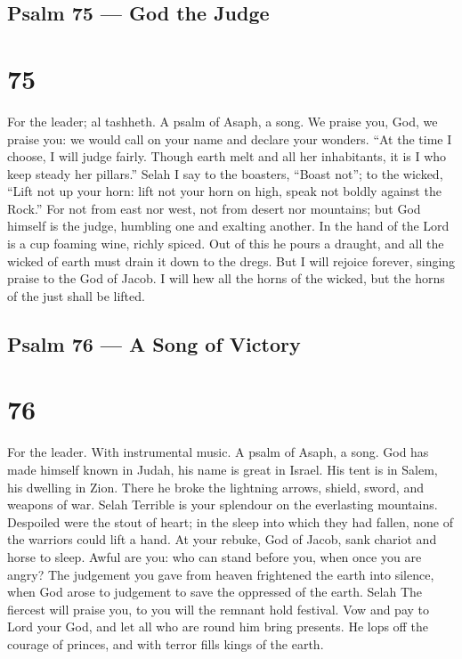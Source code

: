 \hypertarget{psalm-75-god-the-judge}{%
\subsection{Psalm 75 --- God the Judge}\label{psalm-75-god-the-judge}}

\hypertarget{section-74}{%
\section{75}\label{section-74}}

For the leader; al tashheth. A psalm of Asaph, a song.  We
praise you, God, we praise you: we would call on your name and declare
your wonders.  ``At the time I choose, I will judge fairly.
 Though earth melt and all her inhabitants, it is I who keep
steady her pillars.'' Selah  I say to the boasters, ``Boast
not''; to the wicked, ``Lift not up your horn:  lift not
your horn on high, speak not boldly against the Rock.''  For
not from east nor west, not from desert nor mountains;  but
God himself is the judge, humbling one and exalting another.
 In the hand of the Lord is a cup foaming wine, richly
spiced. Out of this he pours a draught, and all the wicked of earth must
drain it down to the dregs.  But I will rejoice forever,
singing praise to the God of Jacob.  I will hew all the
horns of the wicked, but the horns of the just shall be lifted.

\hypertarget{psalm-76-a-song-of-victory}{%
\subsection{Psalm 76 --- A Song of
Victory}\label{psalm-76-a-song-of-victory}}

\hypertarget{section-75}{%
\section{76}\label{section-75}}

For the leader. With instrumental music. A psalm of Asaph, a song.
 God has made himself known in Judah, his name is great in
Israel.  His tent is in Salem, his dwelling in Zion.
 There he broke the lightning arrows, shield, sword, and
weapons of war. Selah  Terrible is your splendour on the
everlasting mountains.  Despoiled were the stout of heart;
in the sleep into which they had fallen, none of the warriors could lift
a hand.  At your rebuke, God of Jacob, sank chariot and
horse to sleep.  Awful are you: who can stand before you,
when once you are angry?  The judgement you gave from heaven
frightened the earth into silence,  when God arose to
judgement to save the oppressed of the earth. Selah  The
fiercest will praise you, to you will the remnant hold festival.
 Vow and pay to Lord your God, and let all who are round
him bring presents.  He lops off the courage of princes,
and with terror fills kings of the earth.

